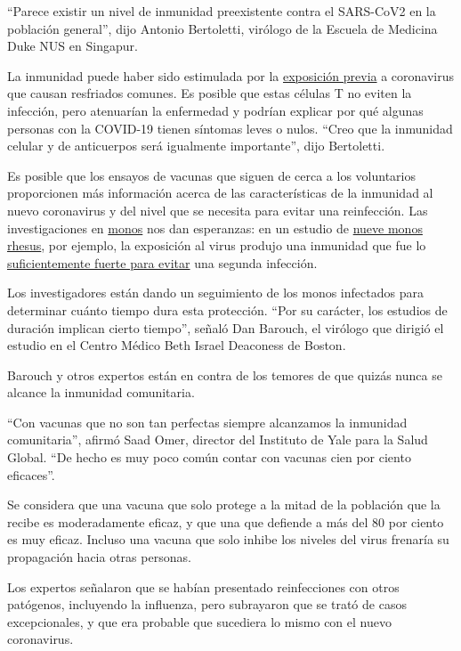 ``Parece existir un nivel de inmunidad preexistente contra el SARS-CoV2
en la población general'', dijo Antonio Bertoletti, virólogo de la
Escuela de Medicina Duke NUS en Singapur.

La inmunidad puede haber sido estimulada por la
\href{https://immunology.sciencemag.org/content/5/48/eabd2071}{exposición
previa} a coronavirus que causan resfriados comunes. Es posible que
estas células T no eviten la infección, pero atenuarían la enfermedad y
podrían explicar por qué algunas personas con la COVID-19 tienen
síntomas leves o nulos. ``Creo que la inmunidad celular y de anticuerpos
será igualmente importante'', dijo Bertoletti.

Es posible que los ensayos de vacunas que siguen de cerca a los
voluntarios proporcionen más información acerca de las características
de la inmunidad al nuevo coronavirus y del nivel que se necesita para
evitar una reinfección. Las investigaciones en
\href{https://science.sciencemag.org/content/early/2020/07/01/science.abc5343}{monos}
nos dan esperanzas: en un estudio de
\href{https://science.sciencemag.org/content/early/2020/05/19/science.abc4776}{nueve
monos rhesus}, por ejemplo, la exposición al virus produjo una inmunidad
que fue lo
\href{https://www.nytimes3xbfgragh.onion/2020/05/20/health/coronavirus-vaccine-harvard.html}{suficientemente
fuerte para evitar} una segunda infección.

Los investigadores están dando un seguimiento de los monos infectados
para determinar cuánto tiempo dura esta protección. ``Por su carácter,
los estudios de duración implican cierto tiempo'', señaló Dan Barouch,
el virólogo que dirigió el estudio en el Centro Médico Beth Israel
Deaconess de Boston.

Barouch y otros expertos están en contra de los temores de que quizás
nunca se alcance la inmunidad comunitaria.

``Con vacunas que no son tan perfectas siempre alcanzamos la inmunidad
comunitaria'', afirmó Saad Omer, director del Instituto de Yale para la
Salud Global. ``De hecho es muy poco común contar con vacunas cien por
ciento eficaces''.

Se considera que una vacuna que solo protege a la mitad de la población
que la recibe es moderadamente eficaz, y que una que defiende a más del
80 por ciento es muy eficaz. Incluso una vacuna que solo inhibe los
niveles del virus frenaría su propagación hacia otras personas.

Los expertos señalaron que se habían presentado reinfecciones con otros
patógenos, incluyendo la influenza, pero subrayaron que se trató de
casos excepcionales, y que era probable que sucediera lo mismo con el
nuevo coronavirus.

